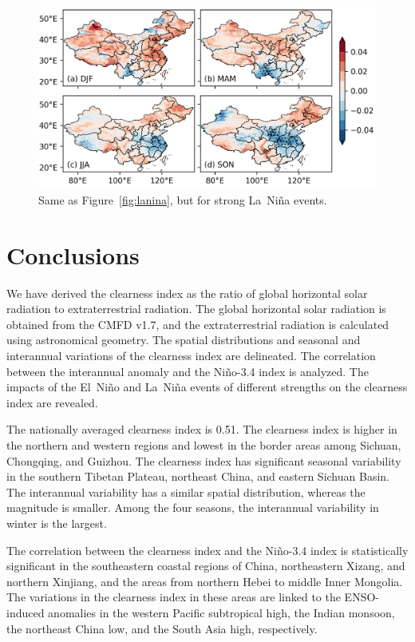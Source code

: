 \documentclass[atmosphere,article,accept,pdftex,moreauthors]{Definitions/mdpi}
\begin{document}
\begin{figure}[H]
    \includegraphics[width=14cm]{fig/anom_stronglanina.png}
  \caption{Same as Figure~\ref{fig:lanina}, but for strong La~Niña events. \label{fig:stronglanina}}
\end{figure}

\section{Conclusions}\label{sec:conclusions}

We have derived the clearness index as the ratio of global horizontal solar radiation to extraterrestrial radiation. The global horizontal solar radiation is obtained from the CMFD v1.7, and the extraterrestrial radiation is calculated using astronomical geometry. The spatial distributions and seasonal and interannual variations of the clearness index are delineated. The correlation between the interannual anomaly and the Niño-3.4 index is analyzed. The impacts of the El~Niño and La~Niña events of different strengths on the clearness index are revealed.

The nationally averaged clearness index is 0.51. The clearness index is higher in the northern and western regions and lowest in the border areas among Sichuan, Chongqing, and Guizhou. The clearness index has significant seasonal variability in the southern Tibetan Plateau, northeast China, and eastern Sichuan Basin. The interannual variability has a similar spatial distribution, whereas the magnitude is smaller. Among the four seasons, the interannual variability in winter is the largest.

The correlation between the clearness index and the Niño-3.4 index is statistically significant in the southeastern coastal regions of China, northeastern Xizang, and northern Xinjiang, and the areas from northern Hebei to middle Inner Mongolia. The variations in the clearness index in these areas are linked to the ENSO-induced anomalies in the western Pacific subtropical high, the Indian monsoon, the northeast China low, and the South Asia high, respectively.
\end{document}
